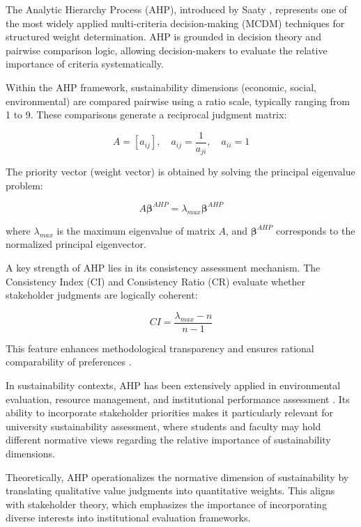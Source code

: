 \documentclass[11pt,a4paper]{article}
\begin{document}
The Analytic Hierarchy Process (AHP), introduced by Saaty \cite{Saaty1980,Saaty2008}, represents one of the most widely applied multi-criteria decision-making (MCDM) techniques for structured weight determination. AHP is grounded in decision theory and pairwise comparison logic, allowing decision-makers to evaluate the relative importance of criteria systematically.

Within the AHP framework, sustainability dimensions (economic, social, environmental) are compared pairwise using a ratio scale, typically ranging from 1 to 9. These comparisons generate a reciprocal judgment matrix:

\begin{equation}
A = [a_{ij}], \quad a_{ij} = \frac{1}{a_{ji}}, \quad a_{ii} = 1
\end{equation}

The priority vector (weight vector) is obtained by solving the principal eigenvalue problem:

\begin{equation}
A \boldsymbol{\beta}^{AHP} = \lambda_{max} \boldsymbol{\beta}^{AHP}
\end{equation}

where $\lambda_{max}$ is the maximum eigenvalue of matrix $A$, and $\boldsymbol{\beta}^{AHP}$ corresponds to the normalized principal eigenvector.

A key strength of AHP lies in its consistency assessment mechanism. The Consistency Index (CI) and Consistency Ratio (CR) evaluate whether stakeholder judgments are logically coherent:

\begin{equation}
CI = \frac{\lambda_{max} - n}{n - 1}
\end{equation}

This feature enhances methodological transparency and ensures rational comparability of preferences \cite{Saaty2008}.

In sustainability contexts, AHP has been extensively applied in environmental evaluation, resource management, and institutional performance assessment \cite{Mardani2015,Zavadskas2011}. Its ability to incorporate stakeholder priorities makes it particularly relevant for university sustainability assessment, where students and faculty may hold different normative views regarding the relative importance of sustainability dimensions.

Theoretically, AHP operationalizes the normative dimension of sustainability by translating qualitative value judgments into quantitative weights. This aligns with stakeholder theory, which emphasizes the importance of incorporating diverse interests into institutional evaluation frameworks.
\end{document}

